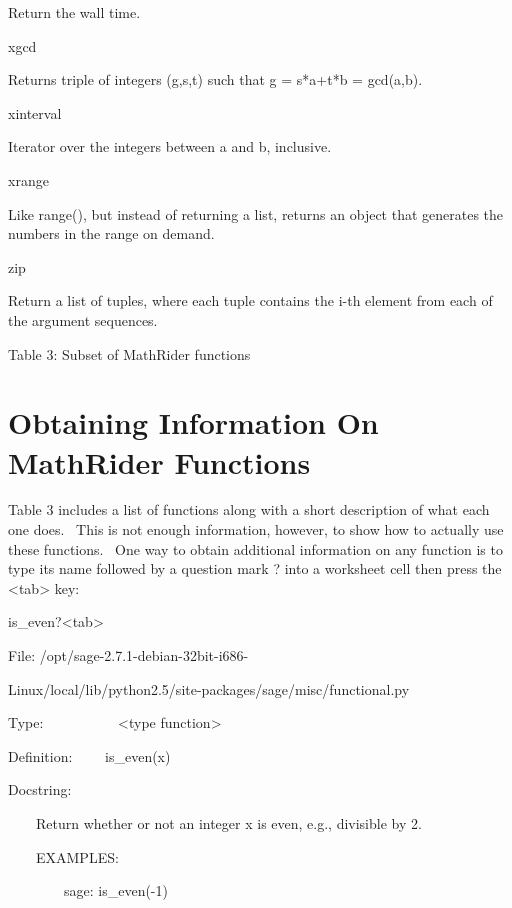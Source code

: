 \documentclass[12pt,twoside]{book}
\begin{document}
Return the wall time.

xgcd

Returns triple of integers (g,s,t) such that g = s*a+t*b = gcd(a,b).

xinterval

Iterator over the integers between a and b, inclusive.

xrange

Like range(), but instead of returning a list, returns an object that
generates the numbers in the range on demand.

zip

Return a list of tuples, where each tuple contains the i{}-th element
from each of the argument sequences.

Table 3: Subset of MathRider functions

\section[Obtaining Information On MathRider Functions]{Obtaining Information On MathRider Functions}

Table 3 includes a list of functions along with a short description of what each one does. \ This is not enough information, however, to show how to actually use these functions. \ One way to obtain additional information on any function is to type its name followed by a question mark {\textquotesingle}?{\textquotesingle} into a worksheet cell then press the {\textless}tab{\textgreater} key: 

\bigskip

is\_even?{\textless}tab{\textgreater}

{\textbar}

File: /opt/sage{}-2.7.1{}-debian{}-32bit{}-i686{}-      

Linux/local/lib/python2.5/site{}-packages/sage/misc/functional.py  

Type: \ \ \ \ \ \ \ \ \ \ {\textless}type
{\textquotesingle}function{\textquotesingle}{\textgreater}        

Definition: \ \ \ \ is\_even(x)         

Docstring:            

              

\ \ \ \ Return whether or not an integer x is even, e.g., divisible by
2.

              

\ \ \ \ EXAMPLES:            

\ \ \ \ \ \ \ \ sage: is\_even({}-1)         
\end{document}
